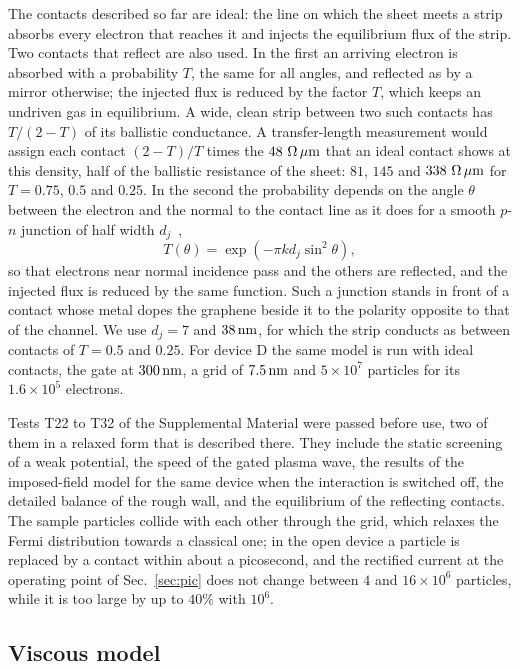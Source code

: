 The contacts described so far are ideal: the line on which the sheet
meets a strip absorbs every electron that reaches it and injects the
equilibrium flux of the strip. Two contacts that reflect are also used.
In the first an arriving electron is absorbed with a probability $T$,
the same for all angles, and reflected as by a mirror otherwise; the
injected flux is reduced by the factor $T$, which keeps an undriven gas
in equilibrium. A wide, clean strip between two such contacts has
$T/(2-T)$ of its ballistic conductance. A transfer-length measurement
would assign each contact $(2-T)/T$ times the $48\ \Omega\,\mu\mathrm{m}$ that an
ideal contact shows at this density, half of the ballistic resistance of
the sheet: $81$, $145$ and $338\ \Omega\,\mu\mathrm{m}$ for $T=0.75$, $0.5$ and
$0.25$. In the second the probability depends on the angle $\theta$
between the electron and the normal to the contact line as it does for a
smooth $p$-$n$ junction of half width
$d_{j}$~\cite{cheianov2006selective},
\begin{equation}
T(\theta)=\exp\left(-\pi k d_{j}\sin^{2}\theta\right),
\label{eq:collimate}
\end{equation}
so that electrons near normal incidence pass and the others are
reflected, and the injected flux is reduced by the same function. Such a
junction stands in front of a contact whose metal dopes the graphene
beside it to the polarity opposite to that of the channel. We use
$d_{j}=7$ and $38\,\mathrm{nm}$, for which the strip conducts as between contacts
of $T=0.5$ and $0.25$. For device D the same model is run with ideal
contacts, the gate at $300\,\mathrm{nm}$, a grid of $7.5\,\mathrm{nm}$ and $5\times10^{7}$
particles for its $1.6\times10^{5}$ electrons.

Tests T22 to T32 of the Supplemental Material were passed before use,
two of them in a relaxed form that is described there.
They include the static screening of a weak
potential, the speed of the gated plasma wave, the
results of the imposed-field model for the same device when the
interaction is switched off, the detailed
balance of the rough wall, and the equilibrium of the reflecting contacts. The sample particles collide with each
other through the grid, which relaxes the Fermi distribution towards a
classical one; in the open device a particle is replaced by a contact
within about a picosecond, and the rectified current at the operating
point of Sec.~\ref{sec:pic} does not change between $4$ and
$16\times10^{6}$ particles, while it is too large by up to $40\%$ with
$10^{6}$.

\subsection{Viscous model}
\label{sec:model-viscous}

